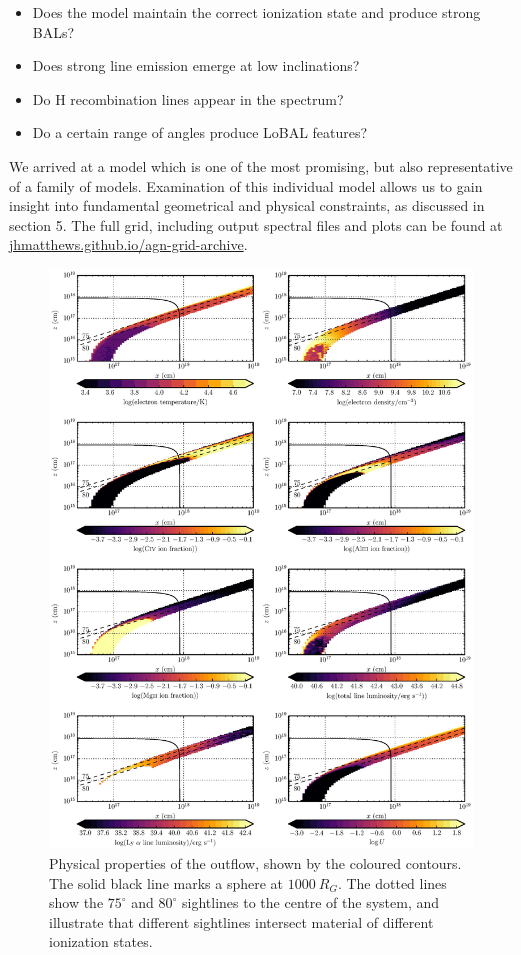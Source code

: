 \documentclass[useAMS,usenatbib]{mn2e_x}
\begin{document}
\begin{itemize}
\item Does the model maintain the correct ionization state and produce strong BALs?
\item Does strong line emission emerge at low inclinations?
\item Do H recombination lines appear in the spectrum?
\item Do a certain range of angles produce LoBAL features?
\end{itemize}

We arrived at a model which is one of the most promising,
but also representative of a family of models. Examination 
of this individual model allows us to gain insight
into fundamental geometrical and physical constraints, 
as discussed in section 5. 
The full grid, including output spectral files and plots can be found at
\url{jhmatthews.github.io/agn-grid-archive}.


\begin{figure} %
\centering
\includegraphics[width=1.0\textwidth]{figures/wind.eps}
\caption
{
Physical properties of the outflow, shown by the coloured contours.
The solid black line marks a sphere at $1000~R_G$.
The dotted lines show the $75^\circ$ and $80^\circ$ sightlines 
to the centre of the system, and illustrate that different sightlines
intersect material of different ionization states.
}
\label{fig:uvspec}
\end{figure} %
\end{document}
